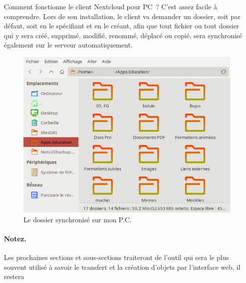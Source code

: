 Comment fonctionne le client Nextcloud pour PC~? 
C'est assez facile à comprendre. 
Lors de son installation, le client va demander un dossier, soit par défaut, soit en le spécifiant et en le créant, afin que tout fichier ou tout dossier qui y sera créé, supprimé, modifié, renommé, déplacé ou copié, sera synchronisé également sur le serveur automatiquement.
\begin{figure} \label{fig-dossier-synchro}
	\centering
	\includegraphics{./Captures/nextcloud-client.dossier.synchronise.png}
	\caption{Le dossier synchronisé sur mon P.C.}
\end{figure}

\paragraph{Notez.} 
Les prochaines sections et sous-sections traiteront de l'outil qui sera le plus souvent utilisé à savoir le transfert et la création d'objets par l'interface web, il restera

